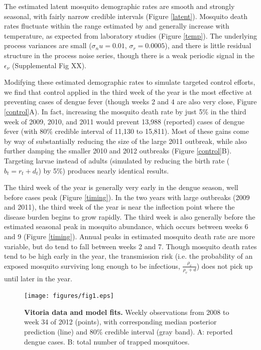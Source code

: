 \documentclass[10pt,letterpaper]{article}
\begin{document}
The estimated latent mosquito demographic rates are smooth and strongly seasonal, with fairly narrow credible intervals (Figure \ref{latent}).
Mosquito death rates fluctuate within the range estimated by \cite{Brady2013} and generally increase with temperature, as expected from laboratory studies \cite{Brady2013}(Figure \ref{temp}).
The underlying process variances are small ($\sigma_nu = 0.01$, $\sigma_r = 0.0005$), and there is little residual structure in the process noise series, though there is a weak periodic signal in the $\epsilon_{\nu}$ (Supplemental Fig XX).

Modifying these estimated demographic rates to simulate targeted control efforts, we find that control applied in the third week of the year is the most effective at preventing cases of dengue fever (though weeks 2 and 4 are also very close, Figure \ref{control}A).
In fact, increasing the mosquito death rate by just 5\% in the third week of 2009, 2010, and 2011 would prevent 13,988 (reported) cases of dengue fever (with 80\% credible interval of 11,130 to 15,811).
Most of these gains come by way of substantially reducing the size of the large 2011 outbreak, while also further damping the smaller 2010 and 2012 outbreaks (Figure \ref{control}B).
Targeting larvae instead of adults (simulated by reducing the birth rate ($b_t = r_t + d_t$) by 5\%) produces nearly identical results.

The third week of the year is generally very early in the dengue season, well before cases peak (Figure \ref{timing}).
In the two years with large outbreaks (2009 and 2011), the third week of the year is near the inflection point where the disease burden begins to grow rapidly.  
The third week is also generally before the estimated seasonal peak in mosquito abundance, which occurs between weeks 6 and 9 (Figure \ref{timing}).
Annual peaks in estimated mosquito death rate are more variable, but do tend to fall between weeks 2 and 7.
Though mosquito death rates tend to be high early in the year, the transmission risk (i.e. the probability of an exposed mosquito surviving long enough to be infectious, $\frac{\rho_v}{\rho_v + d}$) does not pick up until later in the year.

\begin{figure}[!h]
\texttt{[image: figures/fig1.eps]}
\caption{{\bf Vitoria data and model fits.}
Weekly observations from 2008 to week 34 of 2012 (points), with corresponding median posterior prediction (line) and 80\% credible interval (gray band). A: reported dengue cases. B: total number of trapped mosquitoes.
}
\label{timeseries}
\end{figure}
\end{document}
